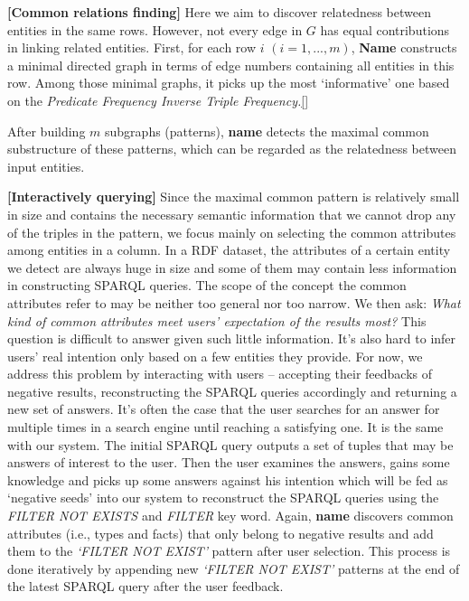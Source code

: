 \documentclass[10pt,conference,letterpaper]{IEEEtran}
\begin{document}
\textbf{[Common relations finding]}
Here we aim to discover relatedness between entities in the same rows. However, not every edge in $G$ has equal contributions in linking related entities. First, for each row $i$ $(i=1,...,m)$, \textbf{Name} constructs a minimal directed graph in terms of edge numbers containing all entities in this row. Among those minimal graphs, it picks up the most `informative' one based on the \emph{Predicate Frequency Inverse Triple Frequency.}\ref{}


After building $m$ subgraphs (patterns), \textbf{name} detects the maximal common substructure of these patterns, which can be regarded as the relatedness between input entities. 



\textbf{[Interactively querying]}
Since the maximal common pattern is relatively small in size and contains the necessary semantic information
that we cannot drop any of the triples in the pattern,
we focus mainly on selecting the common attributes
among entities in a column. In a RDF dataset, the attributes of a certain 
entity we detect are always huge in size and some of them may contain less information in constructing SPARQL queries. %
The scope of the concept the common attributes refer to may be neither too general nor too narrow. 
We then ask: \emph{What kind of common attributes meet users' 
expectation of the results most?} This question is difficult to answer given such little information. It's also hard to infer users' real intention only based on a few entities they provide.
For now, we address this problem by interacting with users -- accepting their feedbacks of negative results, reconstructing the SPARQL queries accordingly and returning a new set of answers.
It's often the case that the user searches for an answer for multiple times in a search engine until reaching a satisfying one. It is the same with our system.
The initial SPARQL query outputs a set of tuples that may be answers of interest to the user. Then the user examines the answers, gains some knowledge and picks up some answers against his intention
which will be fed as `negative seeds' into our system to reconstruct the SPARQL queries using the \emph{FILTER NOT EXISTS} and \emph{FILTER} key word. Again, \textbf{name} discovers common attributes (i.e., types and facts) that only belong to negative results and add them to the \emph{`FILTER NOT EXIST'} pattern after user selection.
This process is done iteratively by appending new \emph{`FILTER NOT EXIST'} patterns at the end of the latest SPARQL query after the user feedback.
\end{document}
